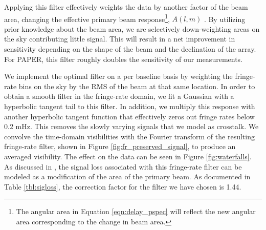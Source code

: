 \documentclass[twocolumn,numberedappendix]{emulateapj} \shorttitle{New Limits on the 21 cm Power Spectrum at $z=8.4$}
\begin{document}
Applying this filter effectively weights the data by another factor of the beam
area, changing the effective primary beam response\footnote{The angular area in
Equation \eqref{eqn:delay_pspec} will reflect the new angular area
corresponding to the change in beam area.}, $A(l,m)$ \citep{parsons_et_al2015}.
By utilizing prior knowledge about the beam area, we are selectively
down-weighting areas on the sky contributing little signal. This will result in
a net improvement in sensitivity depending on the shape of the beam and the
declination of the array. For PAPER, this filter roughly doubles the
sensitivity of our measurements.  

We implement the optimal filter on a per baseline basis by weighting the
fringe-rate bins on the sky by the RMS of the beam at that same location.
In order to obtain a smooth filter in the fringe-rate domain, we fit a Gaussian
with a hyperbolic tangent tail to this filter. In addition, we multiply this
response with another hyperbolic tangent function that effectively zeros out
fringe rates below 0.2 mHz. This removes 
the slowly varying signals that we model as crosstalk. We convolve the
time-domain visibilities with the Fourier transform of the resulting fringe-rate
filter, shown in Figure \ref{fig:fr_preserved_signal}, to produce an averaged
visibility.  The effect on the data can be seen in Figure \ref{fig:waterfalls}.
As discussed in \citet{parsons_et_al2015}, the
signal loss associated with this fringe-rate filter can be modeled as a modification
of the area of the primary beam.  As documented in
Table \ref{tbl:sigloss}, the correction factor for the filter we have chosen is 1.44.



\end{document}
